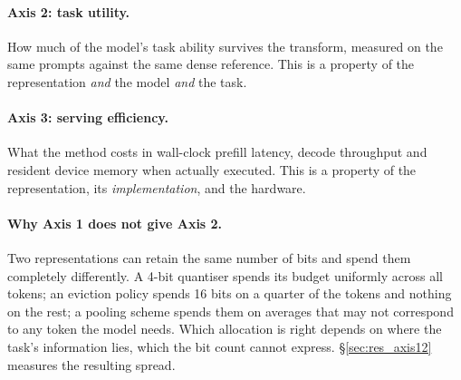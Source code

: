 \documentclass{article}
\theoremstyle{definition}
\begin{document}
\paragraph{Axis 2: task utility.} How much of the model's task ability survives the transform, measured on the same prompts against the same dense reference. This is a property of the representation \emph{and} the model \emph{and} the task.

\paragraph{Axis 3: serving efficiency.} What the method costs in wall-clock prefill latency, decode throughput and resident device memory when actually executed. This is a property of the representation, its \emph{implementation}, and the hardware.

\paragraph{Why Axis 1 does not give Axis 2.} Two representations can retain the same number of bits and spend them completely differently. A 4-bit quantiser spends its budget uniformly across all tokens; an eviction policy spends 16 bits on a quarter of the tokens and nothing on the rest; a pooling scheme spends them on averages that may not correspond to any token the model needs. Which allocation is right depends on where the task's information lies, which the bit count cannot express. \S\ref{sec:res_axis12} measures the resulting spread.
\end{document}
